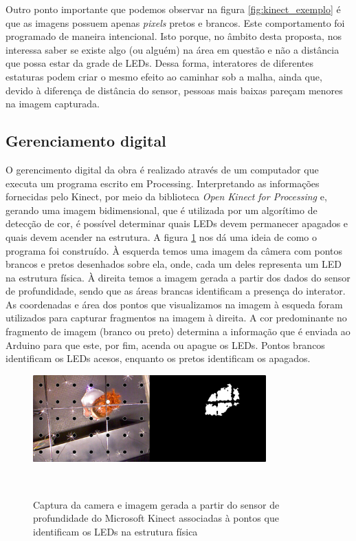 Outro ponto importante que podemos observar na figura \ref{fig:kinect_exemplo} é que as imagens possuem apenas \textit{pixels} pretos e brancos. Este comportamento foi programado de maneira intencional. Isto porque, no âmbito desta proposta, nos interessa saber se existe algo (ou alguém) na área em questão e não a distância que possa estar da grade de LEDs. Dessa forma, interatores de diferentes estaturas podem criar o mesmo efeito ao caminhar sob a malha, ainda que, devido à diferença de distância do sensor, pessoas mais baixas pareçam menores na imagem capturada.


\subsection{Gerenciamento digital}

O gerencimento digital da obra é realizado através de um computador que executa um programa escrito em Processing. Interpretando as informações fornecidas pelo Kinect, por meio da biblioteca \textit{Open Kinect for Processing} e, gerando uma imagem bidimensional, que é utilizada por um algorítimo de detecção de cor, é possível determinar quais LEDs devem permanecer apagados e quais devem acender na estrutura. A figura \ref{fig:script} nos dá uma ideia de como o programa foi construído. À esquerda temos uma imagem da câmera com pontos brancos e pretos desenhados sobre ela, onde, cada um deles representa um LED na estrutura física. À direita temos a imagem gerada a partir dos dados do sensor de profundidade, sendo que as áreas brancas identificam a presença do interator. As coordenadas e área dos pontos que visualizamos na imagem à esqueda foram utilizados para capturar fragmentos na imagem à direita. A cor predominante no fragmento de imagem (branco ou preto) determina a informação que é enviada ao Arduino para que este, por fim, acenda ou apague os LEDs. Pontos brancos identificam os LEDs acesos, enquanto os pretos identificam os apagados.

\begin{figure}[H]
  \begin{center}
    \caption{Captura da camera e imagem gerada a partir do sensor de profundidade do Microsoft Kinect associadas à pontos que identificam os LEDs na estrutura física}
    \vspace*{0,2cm}
    \includegraphics[width=0.8\textwidth]{./04-figuras/script}
    \label{fig:script}
  \end{center}
  \vspace*{-0,9cm}
  \\
\end{figure}

